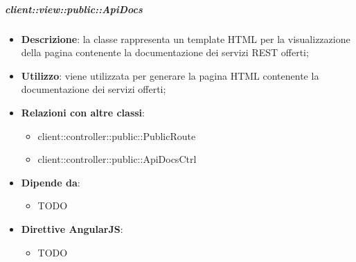 		\subparagraph{client::view::public::ApiDocs} %
		\label{subp:bdsm_app_client_view_public_apidocs}
		
			\begin{itemize}
				\item \textbf{Descrizione}: la classe rappresenta un template HTML per la visualizzazione della pagina contenente la documentazione dei servizi REST offerti;
				\item \textbf{Utilizzo}: viene utilizzata per generare la pagina HTML contenente la documentazione dei servizi offerti;
				\item \textbf{Relazioni con altre classi}:
					\begin{itemize}
						\item client::controller::public::PublicRoute
						\item client::controller::public::ApiDocsCtrl
					\end{itemize}
				\item \textbf{Dipende da}:
					\begin{itemize}
						\item TODO
					\end{itemize}
				\item \textbf{Direttive AngularJS}:
					\begin{itemize}
						\item TODO
					\end{itemize}
			\end{itemize}



